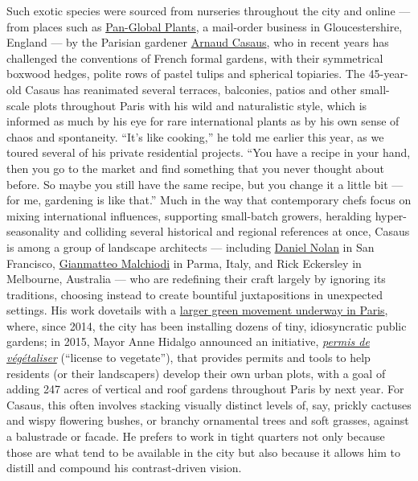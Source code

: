 Such exotic species were sourced from nurseries throughout the city and
online --- from places such as
\href{http://www.panglobalplants.com/}{Pan-Global Plants}, a mail-order
business in Gloucestershire, England --- by the Parisian gardener
\href{http://www.arnaudcasaus.fr/}{Arnaud Casaus}, who in recent years
has challenged the conventions of French formal gardens, with their
symmetrical boxwood hedges, polite rows of pastel tulips and spherical
topiaries. The 45-year-old Casaus has reanimated several terraces,
balconies, patios and other small-scale plots throughout Paris with his
wild and naturalistic style, which is informed as much by his eye for
rare international plants as by his own sense of chaos and spontaneity.
``It's like cooking,'' he told me earlier this year, as we toured
several of his private residential projects. ``You have a recipe in your
hand, then you go to the market and find something that you never
thought about before. So maybe you still have the same recipe, but you
change it a little bit --- for me, gardening is like that.'' Much in the
way that contemporary chefs focus on mixing international influences,
supporting small-batch growers, heralding hyper-seasonality and
colliding several historical and regional references at once, Casaus is
among a group of landscape architects --- including
\href{https://www.danielnolandesign.com/}{Daniel Nolan} in San
Francisco, \href{http://www.gianmatteomalchiodi.com/}{Gianmatteo
Malchiodi} in Parma, Italy, and Rick Eckersley in Melbourne, Australia
--- who are redefining their craft largely by ignoring its traditions,
choosing instead to create bountiful juxtapositions in unexpected
settings. His work dovetails with a
\href{https://www.nytimes3xbfgragh.onion/2019/10/05/world/europe/paris-anne-hildago-green-city-climate-change.html}{larger
green movement underway in Paris}, where, since 2014, the city has been
installing dozens of tiny, idiosyncratic public gardens; in 2015, Mayor
Anne Hidalgo announced an initiative,
\href{https://www.paris.fr/pages/un-permis-pour-vegetaliser-paris-2689}{\emph{permis
de végétaliser}} (``license to vegetate''), that provides permits and
tools to help residents (or their landscapers) develop their own urban
plots, with a goal of adding 247 acres of vertical and roof gardens
throughout Paris by next year. For Casaus, this often involves stacking
visually distinct levels of, say, prickly cactuses and wispy flowering
bushes, or branchy ornamental trees and soft grasses, against a
balustrade or facade. He prefers to work in tight quarters not only
because those are what tend to be available in the city but also because
it allows him to distill and compound his contrast-driven vision.

